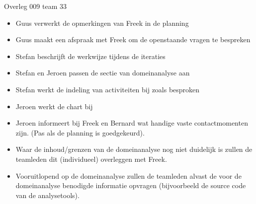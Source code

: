 \documentclass{article}
\begin{document}
\begin{Minutes}{Overleg 009 team 33}
\begin{itemize}
 \item Guus verwerkt de opmerkingen van Freek in de planning
 \item Guus maakt een afspraak met Freek om de openstaande vragen te bespreken
 \item Stefan beschrijft de werkwijze tijdens de iteraties
 \item Stefan en Jeroen passen de sectie van domeinanalyse aan
 \item Stefan werkt de indeling van activiteiten bij zoals besproken
 \item Jeroen werkt de chart bij
 \item Jeroen informeert bij Freek en Bernard wat handige vaste contactmomenten zijn.
 (Pas als de planning is goedgekeurd).
 \item Waar de inhoud/grenzen van de domeinanalyse nog niet duidelijk is zullen de
 teamleden dit (individueel) overleggen met Freek. 
 \item Vooruitlopend op de domeinanalyse zullen de teamleden alvast de voor de 
 domeinanalyse benodigde informatie opvragen (bijvoorbeeld de source code van de analysetools).
\end{itemize}


\end{Minutes}
\end{document}
